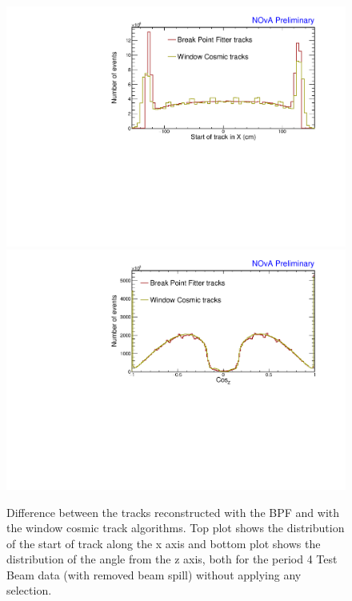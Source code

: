 \begin{enumerate}
\begin{enumerate}
\begin{figure}[!ht]
\includegraphics[width=\textwidth]{Plots/TBCalibration/DBSim_TrackAlgComparison_StartX.pdf}
\includegraphics[width=\textwidth]{Plots/TBCalibration/DBSim_TrackAlgComparison_CosZ.pdf}
\caption[Tracking algorithms for the data-based simulation selection]{Difference between the tracks reconstructed with the \acrshort{BPF} and with the window cosmic track algorithms. Top plot shows the distribution of the start of track along the x axis and bottom plot shows the distribution of the angle from the z axis, both for the period 4 Test Beam data (with removed beam spill) without applying any selection.}
\label{fig:DataBasedSimTrackComparison}
\end{figure}


\end{enumerate}
\end{enumerate}

